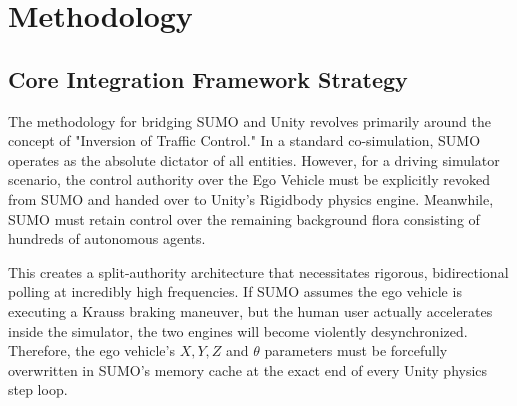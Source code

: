 \chapter{Methodology}

\section{Core Integration Framework Strategy}

The methodology for bridging SUMO and Unity revolves primarily around the concept of "Inversion of Traffic Control." In a standard co-simulation, SUMO operates as the absolute dictator of all entities. However, for a driving simulator scenario, the control authority over the Ego Vehicle must be explicitly revoked from SUMO and handed over to Unity’s Rigidbody physics engine. Meanwhile, SUMO must retain control over the remaining background flora consisting of hundreds of autonomous agents. 

This creates a split-authority architecture that necessitates rigorous, bidirectional polling at incredibly high frequencies. If SUMO assumes the ego vehicle is executing a Krauss braking maneuver, but the human user actually accelerates inside the simulator, the two engines will become violently desynchronized. Therefore, the ego vehicle's $X, Y, Z$ and $\theta$ parameters must be forcefully overwritten in SUMO’s memory cache at the exact end of every Unity physics step loop.

